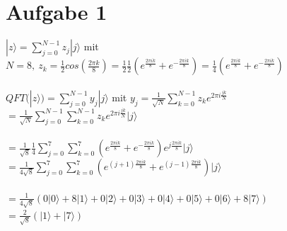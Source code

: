 \documentclass[a4paper]{scrartcl}
\begin{document}
\section*{Aufgabe 1}
$|z\rangle = \sum_{j=0}^{N-1} z_j |j\rangle$ mit $N=8,~ z_k=\frac{1}{2}cos(\frac{2\pi k}{8}) = \frac{1}{2} \frac{1}{2} (e^{\frac{2\pi i k}{8}} + e^{-\frac{2\pi i k}{8}})=\frac{1}{4}(e^{\frac{2\pi i k}{8}} + e^{-\frac{2\pi i k}{8}})$\\\\
$QFT(|z\rangle) = \sum_{j=0}^{N-1}y_j |j\rangle$ mit $y_j=\frac{1}{\sqrt{N}}\sum_{k=0}^{N-1}z_k e^{2\pi i \frac{jk}{N}}$\\
$=\frac{1}{\sqrt{N}}\sum_{j=0}^{N-1}\sum_{k=0}^{N-1}z_k e^{2\pi i \frac{jk}{N}} |j\rangle$\\\\
$=\frac{1}{\sqrt{8}}\frac{1}{4}\sum_{j=0}^{7}\sum_{k=0}^{7}(e^{\frac{2\pi i k}{8}} + e^{-\frac{2\pi i k}{8}}) e^{j \frac{2\pi ik}{8}} |j\rangle$\\
$=\frac{1}{4\sqrt{8}}\sum_{j=0}^{7}\sum_{k=0}^{7}(e^{(j+1)\frac{2\pi i k}{8}} + e^{(j-1)\frac{2\pi i k}{8}}) |j\rangle$ \\\\
$=\frac{1}{4\sqrt{8}} ( 0 |0\rangle +8 |1\rangle + 0 |2\rangle + 0 |3\rangle + 0 |4\rangle+ 0|5\rangle+ 0|6\rangle+ 8|7\rangle)$\\
$=\frac{2}{\sqrt{8}} (|1\rangle + |7\rangle)$\\


\newpage
\end{document}
